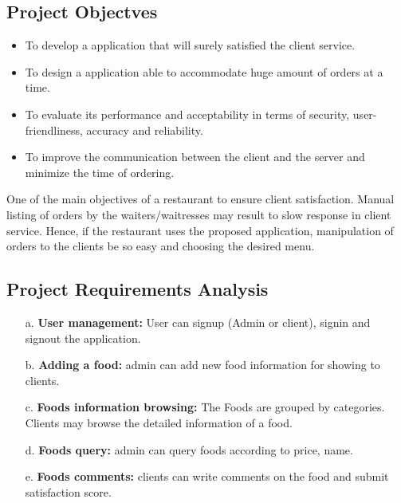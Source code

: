 \documentclass[12pt,a4paper]{article}
\newcommand\tab[1][1cm]{\hspace*{#1}}
\begin{document}
	\subsection{Project Objectves}
\tab{We are stuck with technology when what we really want is just stuff that works. With
the current paradigm shift in technological field, there is an urgent need to embrace and
appreciate the power of technology.Restaurant sector remains vigilant to face the challenges
of change by employing a new strategy that facilities easy management application that can
simplify work for the restaurant admins so that all their work can be efficient and effective.
The general objectives of the study is to develop a reliable, convenient and accurate Ordering System.\\
The study has the following specific objectives:}
		 \begin{itemize}
			\item{To develop a application that will surely satisfied the client service.}
			\item{To design a application able to accommodate huge amount of orders at a time.}
			\item{To evaluate its performance and acceptability in terms of security, user-friendliness, accuracy and reliability.}
			\item{To improve the communication between the client and the server and minimize the time of ordering.}
		\end{itemize}
		
One of the main objectives of a restaurant to ensure client satisfaction. Manual listing of orders by the waiters/waitresses may result to slow response in client service. Hence, if the restaurant uses the proposed application, manipulation of orders to the clients be so easy and choosing the desired menu.

	\subsection{Project Requirements Analysis}
	\tab{Project requirements analysis are important stage in the application development. It
determines the functions of the whole application integrity and stability. Software requirements
analysis is an ongoing process of understanding and progressive refinement. Through
requirements analysis, design functions of the management application as below.}
			\begin{itemize}
				\item[a.]\textbf{User management:} User can signup (Admin or client), signin and signout the application.
				\item[b.]\textbf{Adding a food:} admin can add new food information for showing to clients.
				\item[c.]\textbf{Foods information browsing:} The Foods are grouped by categories. Clients may
browse the detailed information of a food.
				\item[d.]\textbf{Foods query:} admin can query foods according to price, name.
				\item[e.]\textbf{Foods comments:} clients can write comments on the food and submit satisfaction
score.
			\end{itemize}
			\newpage
\end{document}

